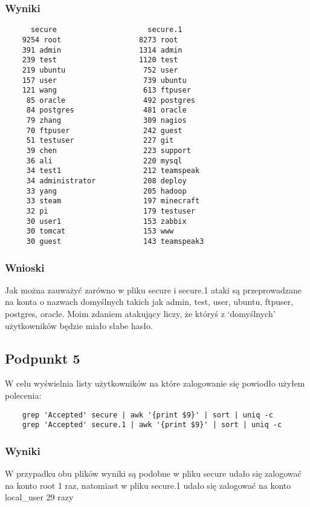 \documentclass{article}
\begin{document}
\subsubsection{Wyniki}
\begin{verbatim}
      secure                     secure.1
    9254 root                  8273 root
    391 admin                  1314 admin
    239 test                   1120 test
    219 ubuntu                  752 user
    157 user                    739 ubuntu
    121 wang                    613 ftpuser
     85 oracle                  492 postgres
     84 postgres                481 oracle
     79 zhang                   309 nagios
     70 ftpuser                 242 guest
     51 testuser                227 git
     39 chen                    223 support
     36 ali                     220 mysql
     34 test1                   212 teamspeak
     34 administrator           208 deploy
     33 yang                    205 hadoop
     33 steam                   197 minecraft
     32 pi                      179 testuser
     30 user1                   153 zabbix
     30 tomcat                  153 www
     30 guest                   143 teamspeak3
\end{verbatim}
\subsubsection{Wnioski}
Jak można zauważyć zarówno w pliku secure i secure.1 ataki są przeprowadzane na konta o nazwach domyślnych takich jak admin, test, user, ubuntu, ftpuser, postgres, oracle. Moim zdaniem atakujący liczy, że któryś z `domyślnych' użytkowników będzie miało słabe hasło.
\subsection{Podpunkt 5}
W celu wyświelnia listy użytkowników na które zalogowanie się powiodło użyłem polecenia:
\begin{verbatim}
    grep 'Accepted' secure | awk '{print $9}' | sort | uniq -c
    grep 'Accepted' secure.1 | awk '{print $9}' | sort | uniq -c
\end{verbatim}

\subsubsection{Wyniki}
W przypadku obu plików wyniki są podobne w pliku secure udało się zalogować na konto root 1 raz, natomiast w pliku secure.1 udało się zalogować na konto local\_user 29 razy
\end{document}
